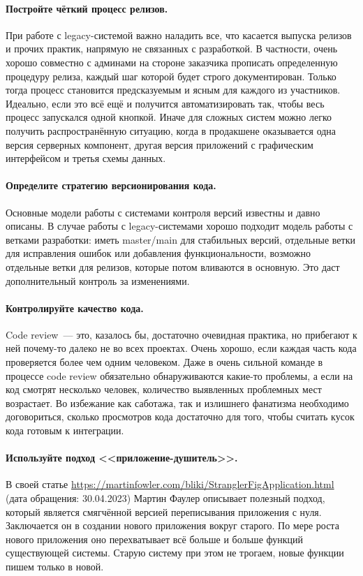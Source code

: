 \documentclass{../../text-style}
\begin{document}
\paragraph{Постройте чёткий процесс релизов.} При работе с legacy-системой важно наладить все, что касается выпуска релизов и прочих практик, напрямую не связанных с разработкой. В частности, очень хорошо совместно с админами на стороне заказчика прописать определенную процедуру релиза, каждый шаг которой будет строго документирован. Только тогда процесс становится предсказуемым и ясным для каждого из участников. Идеально, если это всё ещё и получится автоматизировать так, чтобы весь процесс запускался одной кнопкой. Иначе для сложных систем можно легко получить распространённую ситуацию, когда в продакшене оказывается одна версия серверных компонент, другая версия приложений с графическим интерфейсом и третья схемы данных.

\paragraph{Определите стратегию версионирования кода.} Основные модели работы с системами контроля версий известны и давно описаны. В случае работы с legacy-системами хорошо подходит модель работы с ветками разработки: иметь master/main для стабильных версий, отдельные ветки для исправления ошибок или добавления функциональности, возможно отдельные ветки для релизов, которые потом вливаются в основную. Это даст дополнительный контроль за изменениями.

\paragraph{Контролируйте качество кода.} Code review~--- это, казалось бы, достаточно очевидная практика, но прибегают к ней почему-то далеко не во всех проектах. Очень хорошо, если каждая часть кода проверяется более чем одним человеком. Даже в очень сильной команде в процессе code review обязательно обнаруживаются какие-то проблемы, а если на код смотрят несколько человек, количество выявленных проблемных мест возрастает. Во избежание как саботажа, так и излишнего фанатизма необходимо договориться, сколько просмотров кода достаточно для того, чтобы считать кусок кода готовым к интеграции.

\paragraph{Используйте подход <<приложение-душитель>>.} В своей статье \url{https://martinfowler.com/bliki/StranglerFigApplication.html} (дата обращения: 30.04.2023) Мартин Фаулер описывает полезный подход, который является смягчённой версией переписывания приложения с нуля. Заключается он в создании нового приложения вокруг старого. По мере роста нового приложения оно перехватывает всё больше и больше функций существующей системы. Старую систему при этом не трогаем, новые функции пишем только в новой.
\end{document}

